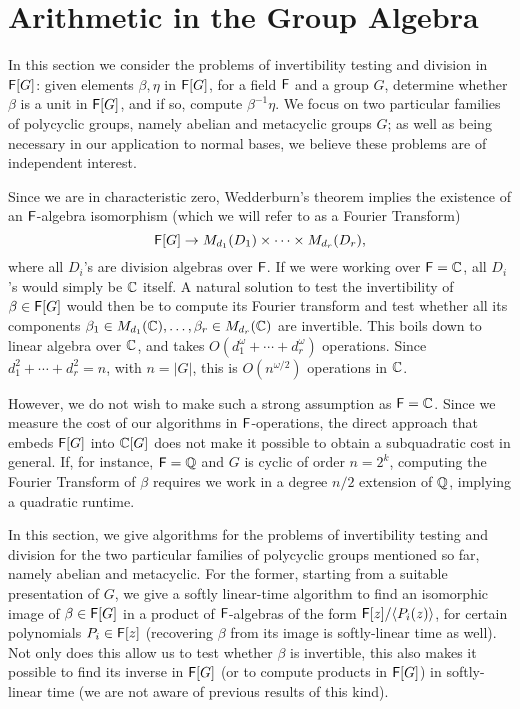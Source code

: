 \section{Arithmetic in the Group Algebra}
\label{sec:invertibility}

In this section we consider the problems of invertibility testing and
division in ${\mathsf{F}}[G]$: given elements $\beta,\eta$ in ${\mathsf{F}}[G]$, for a
field ${\mathsf{F}}$ and a group $G$, determine whether $\beta$ is a unit in
${\mathsf{F}}[G]$, and if so, compute $\beta^{-1}\eta$. We focus on two
particular families of polycyclic groups, namely abelian and
metacyclic groups $G$; as well as being necessary in our application
to normal bases, we believe these problems are of independent
interest.

Since we are in characteristic zero, Wedderburn's theorem implies the
existence of an ${\mathsf{F}}$-algebra isomorphism (which we will refer to as a
Fourier Transform)
\[
  {\mathsf{F}}[G] \to M_{d_1}(D_1) \times \dots \times M_{d_r}(D_r),
\]
where all $D_i$'s are division algebras over ${\mathsf{F}}$. If we were working
over ${\mathsf{F}}=\mathbb{C}$, all $D_i$'s would simply be $\mathbb{C}$ itself.  A natural
solution to test the invertibility of $\beta \in {\mathsf{F}}[G]$ would then be
to compute its Fourier transform and test whether all its components
$\beta_1 \in M_{d_1}(\mathbb{C}),\dots,\beta_r \in M_{d_r}(\mathbb{C})$ are
invertible. This boils down to linear algebra over $\mathbb{C}$, and takes
$O(d_1^\omega + \cdots + d_r^\omega)$ operations.  Since $d_1^2 +
\cdots + d_r^2 = n$, with $n=|G|$, this is $O(n^{\omega/2})$
operations in $\mathbb{C}$.

However, we do not wish to make such a strong assumption as ${\mathsf{F}}=\mathbb{C}$. Since
we measure the cost of our algorithms in ${\mathsf{F}}$-operations, the direct
approach that embeds ${\mathsf{F}}[G]$ into $\mathbb{C}[G]$ does not make it possible to
obtain a subquadratic cost in general. If, for instance, ${\mathsf{F}}=\mathbb{Q}$ and $G$ is
cyclic of order $n=2^k$, computing the Fourier Transform of $\beta$
requires we work in a degree $n/2$ extension of $\mathbb{Q}$, implying a quadratic
runtime.

In this section, we give algorithms for the problems of invertibility
testing and division for the two particular families of polycyclic
groups mentioned so far, namely abelian and metacyclic. For the former,
starting from a suitable presentation of $G$, we give a softly
linear-time algorithm to find an isomorphic image of $\beta \in {\mathsf{F}}[G]$
in a product of ${\mathsf{F}}$-algebras of the form ${\mathsf{F}}[z]/\langle
P_i(z)\rangle$, for certain polynomials $P_i \in {\mathsf{F}}[z]$ (recovering
$\beta$ from its image is softly-linear time as well). Not only does
this allow us to test whether $\beta$ is invertible, this also makes
it possible to find its inverse in ${\mathsf{F}}[G]$ (or to compute products in
${\mathsf{F}}[G]$) in softly-linear time (we are not aware of previous results
of this kind).


